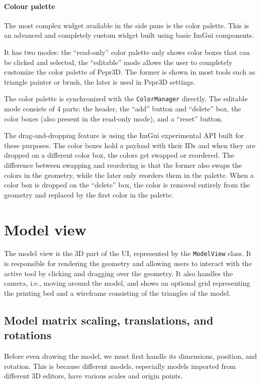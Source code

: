 \paragraph{Colour palette}
The most complex widget available in the side pane is the color palette.
This is an advanced and completely custom widget built using basic ImGui components.

It has two modes: the ``read-only'' color palette only shows color boxes that can be clicked and selected, the ``editable'' mode allows the user to completely customize the color palette of Pepr3D.
The former is shown in most tools such as triangle painter or brush, the later is used in Pepr3D settings.

The color palette is synchronized with the \texttt{ColorManager} directly.
The editable mode consists of 4 parts: the header, the ``add'' button and ``delete'' box, the color boxes (also present in the read-only mode), and a ``reset'' button.

The drag-and-dropping feature is using the ImGui experimental API built for these purposes.
The color boxes hold a payload with their IDs and when they are dropped on a different color box, the colors get swapped or reordered.
The difference between swapping and reordering is that the former also swaps the colors in the geometry, while the later only reorders them in the palette.
When a color box is dropped on the ``delete'' box, the color is removed entirely from the geometry and replaced by the first color in the palette.

\section{Model view}

The model view is the 3D part of the UI, represented by the \texttt{ModelView} class.
It is responsible for rendering the geometry and allowing users to interact with the active tool by clicking and dragging over the geometry.
It also handles the camera, i.e., moving around the model, and shows an optional grid representing the printing bed and a wireframe consisting of the triangles of the model.

\subsection{Model matrix scaling, translations, and rotations}
Before even drawing the model, we must first handle its dimensions, position, and rotation.
This is because different models, especially models imported from different 3D editors, have various scales and origin points.

